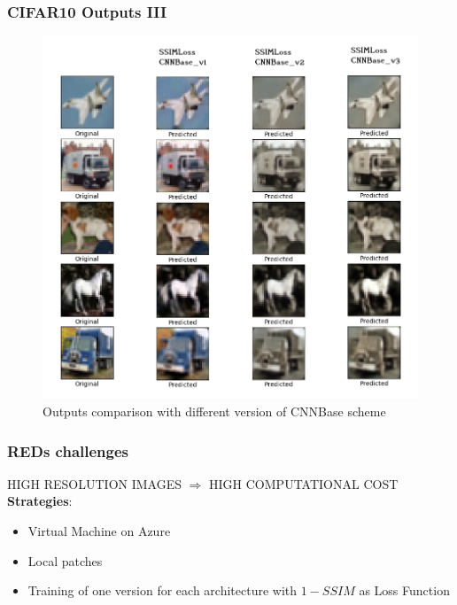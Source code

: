 \documentclass [handout] {beamer}
\begin{document}
\begin{frame}
	\frametitle{CIFAR10 Outputs III}
	\begin{figure}[hptb]
	\centering
	\includegraphics[scale=0.32]{CNNBase_comparison.png}
	\caption{Outputs comparison with different version of CNNBase scheme}
	\label{CNNBase_comparison}
	\end{figure}
\end{frame}


\begin{frame}
	\frametitle{REDs challenges}
	HIGH RESOLUTION IMAGES $\Rightarrow$ HIGH COMPUTATIONAL COST \\
	
	\medskip
	\textbf{Strategies}:
	\begin{itemize}
		\item Virtual Machine on Azure
		\item Local patches 
		\item Training of one version for each architecture with $1-SSIM$ as Loss Function  
	\end{itemize}
\end{frame}
\end{document}
